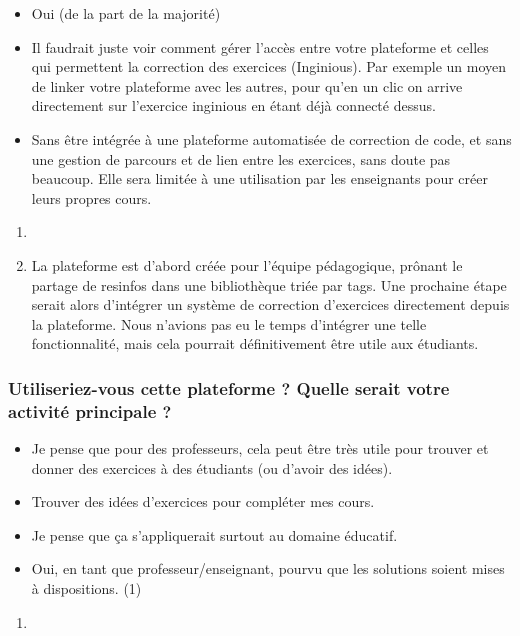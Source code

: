 \begin{itemize}
    \item Oui (de la part de la majorité)
    \item Il faudrait juste voir comment gérer l'accès entre votre plateforme et celles qui permettent la correction des exercices (Inginious). Par exemple un moyen de linker votre plateforme avec les autres, pour qu'en un clic on arrive directement sur l'exercice inginious en étant déjà connecté dessus.
    \item Sans être intégrée à une plateforme automatisée de correction de code, et sans une gestion de parcours et de lien entre les exercices, sans doute pas beaucoup. Elle sera limitée à une utilisation par les enseignants pour créer leurs propres cours.
\end{itemize}
\bigskip
\begin{enumerate}
    \item 
    \item La plateforme est d'abord créée pour l'équipe pédagogique, prônant le partage de \glspl{resinfo} dans une bibliothèque triée par \glspl{tag}. Une prochaine étape serait alors d'intégrer un système de correction d'exercices directement depuis la plateforme. Nous n'avions pas eu le temps d'intégrer une telle fonctionnalité, mais cela pourrait définitivement être utile aux étudiants.
\end{enumerate}

\subsubsection*{Utiliseriez-vous cette plateforme ? Quelle serait votre activité principale ?}

\begin{itemize}
    \item Je pense que pour des professeurs, cela peut être très utile pour trouver et donner des exercices à des étudiants (ou d'avoir des idées).
    \item Trouver des idées d'exercices pour compléter mes cours.
    \item Je pense que ça s'appliquerait surtout au domaine éducatif.
    \item Oui, en tant que professeur/enseignant, pourvu que les solutions soient mises à dispositions. (1)
\end{itemize}
\bigskip
\begin{enumerate}
    \item 
\end{enumerate}

